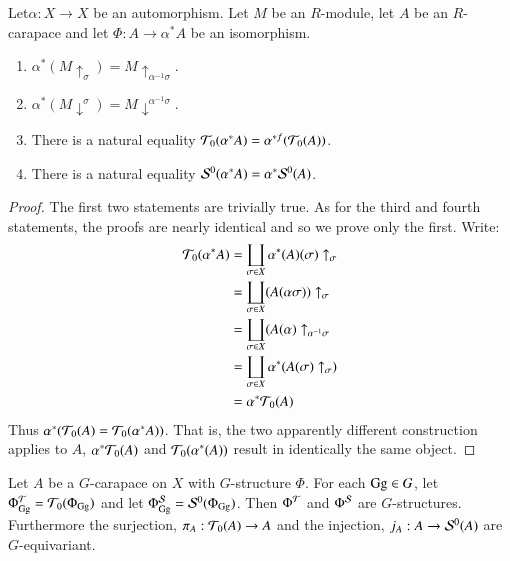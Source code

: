 \begin{seclem}\label{chap6-lemma-8.10}
Let\pageoriginale $\alpha : X \rightarrow X$ be an automorphism. Let $M$ be an $R$-module, let $A$ be an $R$-carapace and let $\Phi : A
\rightarrow \alpha^{*} A$ be an isomorphism.
    \begin{enumerate}[(1)]
        \item $\alpha^{*}(M \uparrow_{\sigma}) = M \uparrow_{\alpha^{-1}\sigma}$.\label{chap6-lemma8.10-enmu-1}
        \item $\alpha^{*}(M \downarrow^{\sigma}) = M\downarrow^{\alpha^{-1}\sigma}$.\label{chap6-lemma8.10-enmu-2}
        \item There is a natural equality $\mathcal{T}_{0}(\alpha^{*}A) = \alpha^{*f}(\mathcal{T}_{0}(A))$.\label{chap6-lemma8.10-enmu-3}
        \item There is a natural equality $\mathcal{S}^{0}(\alpha^{*} A) = \alpha^{*}\mathcal{S}^{0}(A)$.\label{chap6-lemma8.10-enmu-4}
    \end{enumerate} 
\end{seclem}

\begin{proof}
The first two statements are trivially true. As for the third and fourth statements, the proofs are nearly identical and so we prove only the first. Write:
\begin{align*}
\mathcal{T}_{0}(\alpha^{*}A) &= \coprod_{\sigma \in X} \alpha^{*}(A)(\sigma )\uparrow_{\sigma}\\
& = \coprod_{\sigma \in X}(A(\alpha \sigma ))\uparrow_{\sigma}\\
& = \coprod_{\sigma \in X}(A(\alpha)\uparrow_{\alpha^{-1}\sigma}\\
& = \coprod_{\sigma \in X} \alpha^{*}(A(\sigma)\uparrow_{\sigma})\\
& = \alpha^{*}\mathcal{T}_{0}(A)
\end{align*}
Thus $\alpha^{*}(\mathcal{T}_{0}(A) = \mathcal{T}_{0}(\alpha^{*}A))$. That is, the two apparently different construction applies to $A$, $\alpha^{*}\mathcal{T}_{0}(A)$ and $\mathcal{T}_{0}(\alpha^{*}(A))$ result in identically the same object.
\end{proof}

\begin{secprop}\label{chap6-proposition-8.11}
Let $A$ be a $G$-carapace on $X$ with $G$-structure $\Phi$. For each $\operatorname{Gg} \in G$, let $\Phi_{\operatorname{Gg}}^{\mathcal{T}} = \mathcal{T}_{0}(\Phi_{\operatorname{Gg}})$ and let $\Phi_{\operatorname{Gg}}^{\mathcal{S}} = \mathcal{S}^{0}(\Phi_{\operatorname{Gg}})$. Then $\Phi^{\mathcal{T}}$ and $\Phi^{\mathcal{S}}$ are $G$-structures. Furthermore the surjection, $\pi_{A} : \mathcal{T}_{0}(A)\rightarrow A$ and the injection, $j_{A}: A \rightarrow \mathcal{S}^{0}(A)$ are $G$-equivariant.
\end{secprop}

